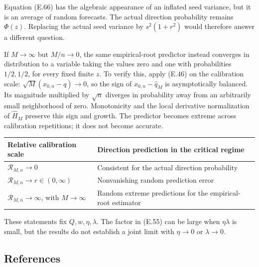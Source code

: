 Equation (E.66) has the algebraic appearance of an inflated seed
variance, but it is an average of random forecasts. The actual direction
probability remains \(\Phi(z)\). Replacing the actual seed variance by
\(s^2(1+r^2)\) would therefore answer a different question.

If \(M\to\infty\) but \(M/n\to0\), the same empirical-root predictor
instead converges in distribution to a variable taking the values zero
and one with probabilities \(1/2,1/2\), for every fixed finite \(z\). To
verify this, apply (E.46) on the calibration scale:
\(\sqrt M(x_{0,n}-q)\to0\), so the sign of \(x_{0,n}-\widehat q_M\) is
asymptotically balanced. Its magnitude multiplied by \(\sqrt n\)
diverges in probability away from an arbitrarily small neighborhood of
zero. Monotonicity and the local derivative normalization of
\(\widehat H_M\) preserve this sign and growth. The predictor becomes
extreme across calibration repetitions; it does not become accurate.

{\def\LTcaptype{table} %
\begin{longtable}[]{@{}
  >{\raggedright\arraybackslash}p{}
  >{\raggedright\arraybackslash}p{}@{}}
\toprule\noalign{}
\begin{minipage}[b]{\linewidth}\raggedright
Relative calibration scale
\end{minipage} & \begin{minipage}[b]{\linewidth}\raggedright
Direction prediction in the critical regime
\end{minipage} \\
\midrule\noalign{}
\endhead
\bottomrule\noalign{}
\endlastfoot
\(\mathcal R_{M,n}\to0\) & Consistent for the actual direction
probability \\
\(\mathcal R_{M,n}\to r\in(0,\infty)\) & Nonvanishing random prediction
error \\
\(\mathcal R_{M,n}\to\infty\), with \(M\to\infty\) & Random extreme
predictions for the empirical-root estimator \\
\end{longtable}
}

These statements fix \(Q,w,\eta,\lambda\). The factor in (E.55) can be
large when \(\eta\lambda\) is small, but the results do not establish a
joint limit with \(\eta\to0\) or \(\lambda\to0\).

\subsection{References}\label{calibration-references}

